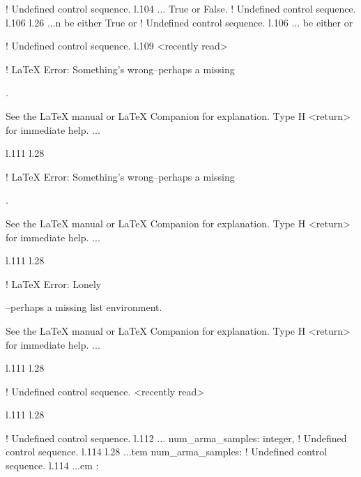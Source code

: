 {{{{{{{{{{{{! Undefined control sequence.
l.104 ...                     {True} or \xmlString
                                                  {False}.
! Undefined control sequence.
l.106 l.26 ...n be either \xmlString
                                    {True} or \xmlString
! Undefined control sequence.
l.106 ... be either  or \xmlString
                                                  
! Undefined control sequence.
l.109 <recently read> \xmlNode
                              

! LaTeX Error: Something's wrong--perhaps a missing \item.

See the LaTeX manual or LaTeX Companion for explanation.
Type  H <return>  for immediate help.
 ...                                              
                                                  
l.111 l.28     \item \xmlNode
                             

! LaTeX Error: Something's wrong--perhaps a missing \item.

See the LaTeX manual or LaTeX Companion for explanation.
Type  H <return>  for immediate help.
 ...                                              
                                                  
l.111 l.28     \item \xmlNode
                             

! LaTeX Error: Lonely \item--perhaps a missing list environment.

See the LaTeX manual or LaTeX Companion for explanation.
Type  H <return>  for immediate help.
 ...                                              
                                                  
l.111 l.28     \item \xmlNode
                             
! Undefined control sequence.
<recently read> \xmlNode 
                         
l.111 l.28     \item \xmlNode
                             
! Undefined control sequence.
l.112 ...           {num\_arma\_samples}: \xmlDesc
                                                  {integer},
! Undefined control sequence.
l.114 l.28 ...tem \xmlNode
                          {num\_arma\_samples}: \xmlDesc
! Undefined control sequence.
l.114 ...em : \xmlDesc
                                                  
}}}}}}}}}}}}
